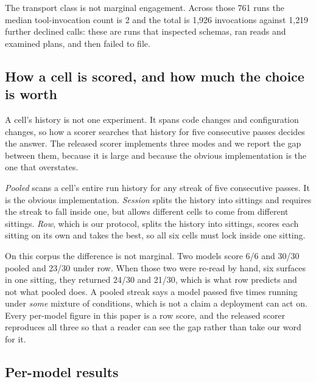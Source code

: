 \documentclass[11pt]{article}
\begin{document}
The transport class is not marginal engagement. Across those 761 runs the median tool-invocation count is 2 and
the total is 1{,}926 invocations against 1{,}219 further declined calls: these are runs that inspected schemas,
ran reads and examined plans, and then failed to file.

\subsection{How a cell is scored, and how much the choice is worth}
\label{sec:scoring}

A cell's history is not one experiment. It spans code changes and configuration changes, so how a scorer searches
that history for five consecutive passes decides the answer. The released scorer implements three modes and we
report the gap between them, because it is large and because the obvious implementation is the one that
overstates.

\emph{Pooled} scans a cell's entire run history for any streak of five consecutive passes. It is the obvious
implementation. \emph{Session} splits the history into sittings and requires the streak to fall inside one, but
allows different cells to come from different sittings. \emph{Row}, which is our protocol, splits the history into
sittings, scores each sitting on its own and takes the best, so all six cells must lock inside one sitting.

On this corpus the difference is not marginal. Two models score 6/6 and 30/30 pooled and 23/30 under row. When
those two were re-read by hand, six surfaces in one sitting, they returned 24/30 and 21/30, which is what row
predicts and not what pooled does. A pooled streak says a model passed five times running under \emph{some}
mixture of conditions, which is not a claim a deployment can act on. Every per-model figure in this paper is a
row score, and the released scorer reproduces all three so that a reader can see the gap rather than take our
word for it.

\subsection{Per-model results}
\end{document}
